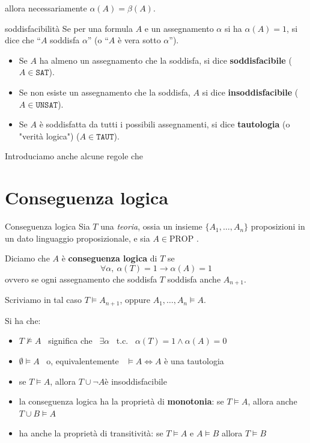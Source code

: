 \documentclass[a4paper,11pt]{report}
\begin{document}
allora necessariamente \( \alpha(A) = \beta(A) \). 

\begin{gframe}[colframe=PineGreen]{soddisfacibilità}
    Se per una formula \( A \) e un assegnamento \( \alpha \) si ha \( \alpha (A) = 1 \), si dice che ``\(A \) soddisfa \( \alpha \)'' (o ``\( A \) è vera sotto \( \alpha \)'').
    \begin{itemize}
        \item Se \( A \) ha almeno un assegnamento che la soddisfa, si dice \textbf{soddisfacibile} (\( A \in \texttt{SAT} \)).
        \item Se non esiste un assegnamento che la soddisfa, \( A \) si dice \textbf{insoddisfacibile} (\( A \in \texttt{UNSAT} \)).
        \item Se \( A \) è soddisfatta da tutti i possibili assegnamenti, si dice \textbf{tautologia} (o "verità logica") (\( A \in \texttt{TAUT} \)).
    \end{itemize}
\end{gframe}

Introduciamo anche alcune regole che 

\section{Conseguenza logica}

\begin{defframe}{Conseguenza logica}{}
    Sia \( T \) una \textit{teoria}, ossia un insieme  \( \{A_1, \dots, A_n\} \) proposizioni in un dato linguaggio proposizionale, e sia \( A \in \text{PROP}\) .

    Diciamo che \( A \) è \textbf{conseguenza logica} di \( T\) se 
    \[ \forall \alpha,\ \alpha(T)=1 \to \alpha(A)=1 \] 
    ovvero se ogni assegnamento che soddisfa \(T\) soddisfa anche \( A_{n+1} \).

    Scriviamo in tal caso \(  T \vDash A_{n+1} \), oppure \( A_1, \dots, A_n \vDash A \).
\end{defframe}

Si ha che:
\begin{itemize}
    \item \(T \not\vDash A\) \ significa che \ \( \exists \alpha \) \ t.c. \ \( \alpha(T) = 1 \land \alpha(A) = 0 \)
    \item \( \emptyset \vDash A \) \ o, equivalentemente \ \( \vDash A \iff A\) è una tautologia
    \item se \( T \vDash A \), allora \( T \cup \neg A \)è insoddisfacibile
    \item la conseguenza logica ha la proprietà di \textbf{monotonia}: se \( T \vDash A \), allora anche \( T \cup B \vDash A \)
    \item ha anche la proprietà di transitività: se \( T \vDash A \) e \( A \vDash B \) allora \( T\vDash B \)
\end{itemize}
\end{document}

